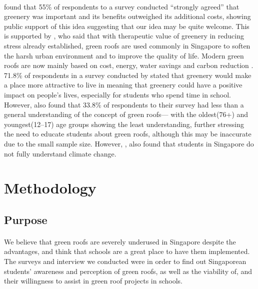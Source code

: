 \documentclass[a4paper]{article}
\begin{document}
\begin{multicols}{2}
  \paragraph{} \textcite{CommAwareGBSyd} found that 55\% of
  respondents to a survey conducted ``strongly agreed'' that greenery
  was important and its benefits outweighed its additional costs,
  showing public support of this idea suggesting that our idea may be
  quite welcome. This is supported by \textcite{CFGRSG}, who said that with
  therapeutic value of greenery in reducing stress already established,
  green roofs are used commonly in Singapore to soften the harsh
  urban environment and to improve the quality of life. Modern green
  roofs are now mainly based on cost, energy, water savings and carbon
  reduction \parencite{CFGRSG}. 71.8\% of respondents in a survey
  conducted by \textcite{CommAwareGBSyd} stated that greenery would make
  a place more attractive to live in meaning that greenery could have
  a positive impact on people's lives, especially for students who
  spend time in school. However, \textcite{GRBuildEnSave} also found that
  33.8\% of respondents to their survey had less than a general
  understanding of the concept of green roofs--- with the oldest(76+)
  and youngest(12--17) age groups showing the least understanding,
  further stressing the need to educate students about green roofs,
  although this may be inaccurate due to the small sample size. However,
  \textcite{student_carbon_footprint}, also found that students in Singapore
  do not fully understand climate change.

  \section{Methodology}
  \subsection{Purpose}
  \paragraph{} We believe that green roofs are severely underused
  in Singapore despite the advantages, and think that schools are a
  great place to have them implemented. The surveys and interview we
  conducted were in order to find out Singaporean students' awareness
  and perception of green roofs, as well as the viability of, and their
  willingness to assist in green roof projects in schools.


\end{multicols}
\end{document}
